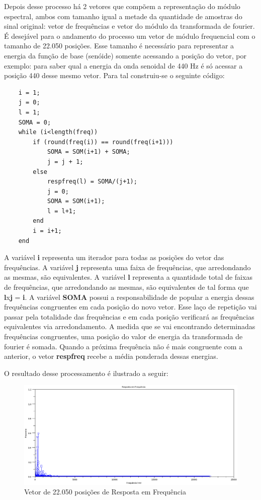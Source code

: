 Depois desse processo há 2 vetores que compõem a representação do módulo espectral, ambos com tamanho igual a metade da quantidade de amostras do sinal original: vetor de frequências e vetor do módulo da transformada de fourier. É desejável para o andamento do processo um vetor de módulo frequencial com o tamanho de 22.050 posições. Esse tamanho é necessário para representar a energia da função de base (senóide) somente acessando a posição do vetor, por exemplo: para saber qual a energia da onda senoidal de 440 Hz é só acessar a posição 440 desse mesmo vetor. Para tal construiu-se o seguinte código:
\begin{lstlisting}
	i = 1;
	j = 0;
	l = 1;
	SOMA = 0;
	while (i<length(freq))
    	if (round(freq(i)) == round(freq(i+1)))
        	SOMA = SOM(i+1) + SOMA;
        	j = j + 1;
   	 	else
        	respfreq(l) = SOMA/(j+1);
        	j = 0;
        	SOMA = SOM(i+1);
        	l = l+1;
    	end
    	i = i+1;
	end
\end{lstlisting}

A variável \textbf{i} representa um iterador para todas as posições do vetor das frequências. A variável \textbf{j} representa uma faixa de frequências, que arredondando as mesmas, são equivalentes. A variável \textbf{l} representa a quantidade total de faixas de frequências, que arredondando as mesmas, são equivalentes de tal forma que \textbf{l}x\textbf{j} = \textbf{i}. A variável \textbf{SOMA} possui a responsabilidade de popular a energia dessas frequências congruentes em cada posição do novo vetor. Esse laço de repetição vai passar pela totalidade das frequências e em cada posição verificará as frequências equivalentes via arredondamento. A medida que se vai encontrando determinadas frequências congruentes, uma posição do valor de energia da transformada de fourier é somada. Quando a próxima frequência não é mais congruente com a anterior, o vetor \textbf{respfreq} recebe a média ponderada dessas energias.

O resultado desse processamento é ilustrado a seguir:

\begin{figure}[h]
	\centering
		\includegraphics[keepaspectratio=true,scale=0.45]{figuras/fft-resultado}
	\caption{Vetor de 22.050 posições de Resposta em Frequência}
\end{figure}

